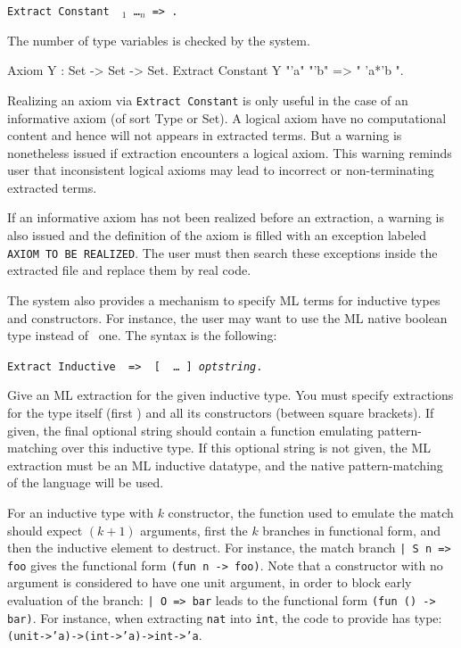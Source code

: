 \begin{description}
\item{\tt Extract Constant \qualid\ \str$_1$ \ldots \str$_n$ => \str.} ~\par
\end{description}

The number of type variables is checked by the system. 

\Example
\begin{coq_example}
Axiom Y : Set -> Set -> Set.
Extract Constant Y "'a" "'b" => " 'a*'b ".
\end{coq_example}

Realizing an axiom via {\tt Extract Constant} is only useful in the
case of an informative axiom (of sort Type or Set). A logical axiom
have no computational content and hence will not appears in extracted
terms. But a warning is nonetheless issued if extraction encounters a
logical axiom. This warning reminds user that inconsistent logical
axioms may lead to incorrect or non-terminating extracted terms.

If an informative axiom has not been realized before an extraction, a
warning is also issued and the definition of the axiom is filled with
an exception labeled {\tt AXIOM TO BE REALIZED}. The user must then
search these exceptions inside the extracted file and replace them by
real code.


The system also provides a mechanism to specify ML terms for inductive
types and constructors.  For instance, the user may want to use the ML
native boolean type instead of \Coq\ one.  The syntax is the following:

\begin{description}
\item{\tt Extract Inductive \qualid\ => \str\ [ \str\ \dots \str\ ]\
{\it optstring}.} ~\par
  Give an ML extraction for the given inductive type. You must specify
  extractions for the type itself (first \str) and all its
  constructors (between square brackets). If given, the final optional
  string should contain a function emulating pattern-matching over this
  inductive type. If this optional string is not given, the ML
  extraction must be an ML inductive datatype, and the native
  pattern-matching of the language will be used.
\end{description}

For an inductive type with $k$ constructor, the function used to
emulate the match should expect $(k+1)$ arguments, first the $k$
branches in functional form, and then the inductive element to
destruct. For instance, the match branch \verb$| S n => foo$ gives the
functional form \verb$(fun n -> foo)$. Note that a constructor with no
argument is considered to have one unit argument, in order to block
early evaluation of the branch: \verb$| O => bar$ leads to the functional
form \verb$(fun () -> bar)$. For instance, when extracting {\tt nat}
into {\tt int}, the code to provide has type:
{\tt (unit->'a)->(int->'a)->int->'a}.
    
